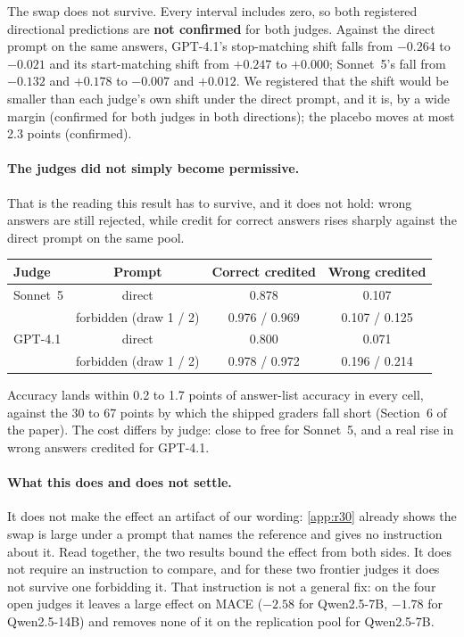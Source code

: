 \noindent The swap does not survive. Every interval includes zero, so both registered directional predictions
are \textbf{not confirmed} for both judges. Against the direct prompt on the same answers, GPT-4.1's
stop-matching shift falls from $-0.264$ to $-0.021$ and its start-matching shift from $+0.247$ to $+0.000$;
Sonnet~5's fall from $-0.132$ and $+0.178$ to $-0.007$ and $+0.012$. We registered that the shift would be
smaller than each judge's own shift under the direct prompt, and it is, by a wide margin (confirmed for both
judges in both directions); the placebo moves at most 2.3 points (confirmed).

\paragraph{The judges did not simply become permissive.} That is the reading this result has to survive, and
it does not hold: wrong answers are still rejected, while credit for correct answers rises sharply against
the direct prompt on the same pool.

\begin{center}\footnotesize
\begin{tabular}{lccc}
\toprule
Judge & Prompt & Correct credited & Wrong credited \\
\midrule
Sonnet~5 & direct & 0.878 & 0.107 \\
 & forbidden (draw 1 / 2) & 0.976 / 0.969 & 0.107 / 0.125 \\
\addlinespace[2pt]
GPT-4.1 & direct & 0.800 & 0.071 \\
 & forbidden (draw 1 / 2) & 0.978 / 0.972 & 0.196 / 0.214 \\
\bottomrule
\end{tabular}
\end{center}

\noindent Accuracy lands within 0.2 to 1.7 points of answer-list accuracy in every cell, against the 30 to 67
points by which the shipped graders fall short (Section~6 of the paper). The cost differs by judge: close to
free for Sonnet~5, and a real rise in wrong answers credited for GPT-4.1.

\paragraph{What this does and does not settle.} It does not make the effect an artifact of our wording:
\cref{app:r30} already shows the swap is large under a prompt that names the reference and gives no
instruction about it. Read together, the two results bound the effect from both sides. It does not require an
instruction to compare, and for these two frontier judges it does not survive one forbidding it.
That instruction is not a general fix: on the four open judges it leaves a large effect on \textsc{MACE} ($-2.58$ for Qwen2.5-7B, $-1.78$ for Qwen2.5-14B) and removes none of it on the replication pool for Qwen2.5-7B.

